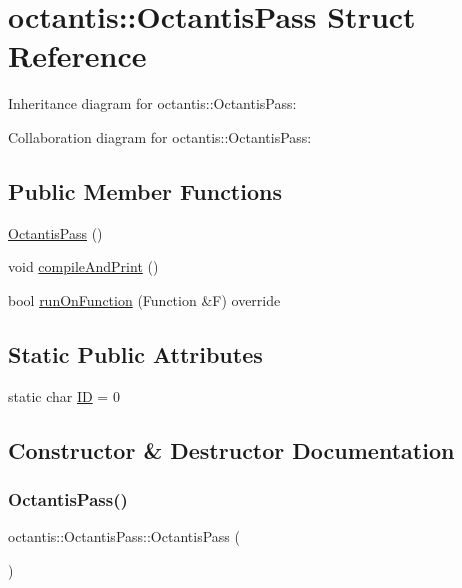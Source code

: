\hypertarget{structoctantis_1_1OctantisPass}{}\section{octantis\+:\+:Octantis\+Pass Struct Reference}
\label{structoctantis_1_1OctantisPass}


Inheritance diagram for octantis\+:\+:Octantis\+Pass\+:


Collaboration diagram for octantis\+:\+:Octantis\+Pass\+:
\subsection*{Public Member Functions}
\begin{DoxyCompactItemize}
\item 
\hyperlink{structoctantis_1_1OctantisPass_a47caf34ff1187522621d58f636579af7}{Octantis\+Pass} ()
\item 
void \hyperlink{structoctantis_1_1OctantisPass_a9928748c5a25565dec5b98ccba4b12c3}{compile\+And\+Print} ()
\item 
bool \hyperlink{structoctantis_1_1OctantisPass_a2d156c9326f2eaf75969e34aa09df2e5}{run\+On\+Function} (Function \&F) override
\end{DoxyCompactItemize}
\subsection*{Static Public Attributes}
\begin{DoxyCompactItemize}
\item 
static char \hyperlink{structoctantis_1_1OctantisPass_a71e0902b7f244b6aa98ef9f3d34c8637}{ID} = 0
\end{DoxyCompactItemize}


\subsection{Constructor \& Destructor Documentation}
\mbox{\label{structoctantis_1_1OctantisPass_a47caf34ff1187522621d58f636579af7}} 
\subsubsection{\texorpdfstring{Octantis\+Pass()}{OctantisPass()}}
{\footnotesize\ttfamily octantis\+::\+Octantis\+Pass\+::\+Octantis\+Pass (\begin{DoxyParamCaption}{ }\end{DoxyParamCaption})\hspace{0.3cm}{\ttfamily [inline]}}



